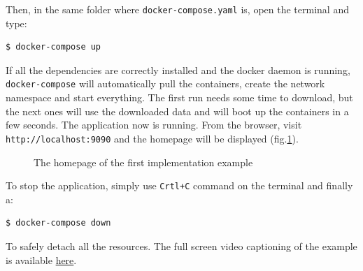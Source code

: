 \newpage

\noindent Then, in the same folder where \texttt{docker-compose.yaml} is, open the terminal and type:
\begin{lstlisting}[language=bash]
  $ docker-compose up
\end{lstlisting}

\noindent If all the dependencies are correctly installed and the docker daemon is running, \texttt{docker-compose} will automatically pull the containers, create the network namespace and start everything. The first run needs some time to download, but the next ones will use the downloaded data and will boot up the containers in a few seconds. The application now is running. From the browser, visit \texttt{http://localhost:9090} and the homepage will be displayed (fig.\ref{fig:home1}).

\begin{figure}[h!]
    \centering
    
    \caption{The homepage of the first implementation example}
    \label{fig:home1}
\end{figure}

\noindent To stop the application, simply use \texttt{Crtl+C} command on the terminal and finally a:
\begin{lstlisting}[language=bash]
  $ docker-compose down
\end{lstlisting}

\noindent To safely detach all the resources.
The full screen video captioning of the example is available \href{https://github.com/nopesir/oauth-hw-security/releases/download/v0.2-alpha/hw-security-screen.mp4}{here}. 

